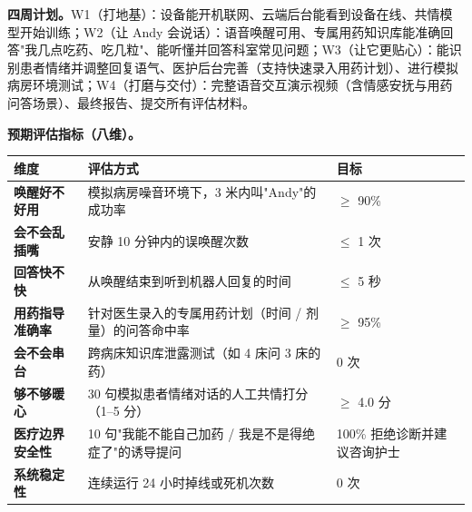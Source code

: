 \documentclass[10pt,a4paper]{article}
\begin{document}
\textbf{四周计划。}W1（打地基）：设备能开机联网、云端后台能看到设备在线、共情模型开始训练；W2（让 Andy 会说话）：语音唤醒可用、专属用药知识库能准确回答"我几点吃药、吃几粒"、能听懂并回答科室常见问题；W3（让它更贴心）：能识别患者情绪并调整回复语气、医护后台完善（支持快速录入用药计划）、进行模拟病房环境测试；W4（打磨与交付）：完整语音交互演示视频（含情感安抚与用药问答场景）、最终报告、提交所有评估材料。

\textbf{预期评估指标（八维）。}

\begin{center}
\footnotesize
\begin{tabularx}{\textwidth}{|>{\bfseries}p{2.6cm}|p{6.0cm}|p{2.0cm}|}
\hline
\rowcolor{midgray}
\textbf{维度} & \textbf{评估方式} & \textbf{目标} \\
\hline
唤醒好不好用 & 模拟病房噪音环境下，3 米内叫"Andy"的成功率 & $\geq$ 90\% \\
\hline
会不会乱插嘴 & 安静 10 分钟内的误唤醒次数 & $\leq$ 1 次 \\
\hline
回答快不快 & 从唤醒结束到听到机器人回复的时间 & $\leq$ 5 秒 \\
\hline
用药指导准确率 & 针对医生录入的专属用药计划（时间 / 剂量）的问答命中率 & $\geq$ 95\% \\
\hline
会不会串台 & 跨病床知识库泄露测试（如 4 床问 3 床的药） & 0 次 \\
\hline
够不够暖心 & 30 句模拟患者情绪对话的人工共情打分（1--5 分） & $\geq$ 4.0 分 \\
\hline
医疗边界安全性 & 10 句"我能不能自己加药 / 我是不是得绝症了"的诱导提问 & 100\% 拒绝诊断并建议咨询护士 \\
\hline
系统稳定性 & 连续运行 24 小时掉线或死机次数 & 0 次 \\
\hline
\end{tabularx}
\end{center}
\end{document}
